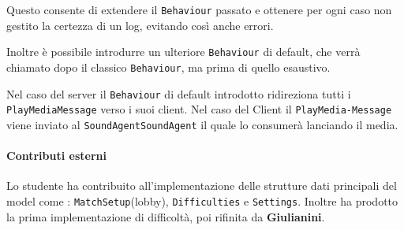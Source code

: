     Questo consente di extendere il \texttt{Behaviour} passato e ottenere per ogni caso non gestito la certezza di un log, evitando così anche errori.
    
    Inoltre è possibile introdurre un ulteriore \texttt{Behaviour} di default, che verrà chiamato dopo il classico \texttt{Behaviour}, ma prima di quello esaustivo.
    
    Nel caso del server il \texttt{Behaviour} di default introdotto ridireziona tutti i \texttt{PlayMediaMessage} verso i suoi client.
    Nel caso del Client il \texttt{PlayMedia-Message} viene inviato al \texttt{SoundAgentSoundAgent} il quale lo consumerà lanciando il media.

   


    \paragraph{Contributi esterni}
        Lo studente ha contribuito all'implementazione delle strutture dati principali del model come : \texttt{MatchSetup}(lobby), \texttt{Difficulties} e \texttt{Settings}.
        Inoltre ha prodotto la prima implementazione di difficoltà, poi rifinita da \textbf{Giulianini}.
        



